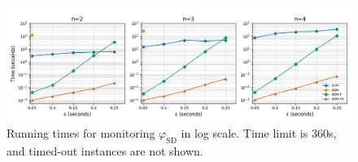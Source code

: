 \documentclass[iicol,lineno]{sn-jnl}
\newcommand{\?}{\text{?}}
\begin{document}
	\begin{figure}[t]
		\begin{center}
			\includegraphics[width=\linewidth]{ms_newnames.png}
			\caption{Running times for monitoring $\varphi_{\text{SD}}$ in log scale. Time limit is 360s, and timed-out instances are not shown.}
		\end{center}
	\end{figure}
	\clearpage
	
	
	
%	
\end{document}
